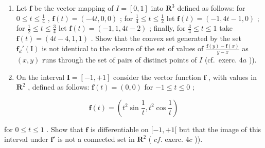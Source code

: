 \begin{enumerate}
\def\labelenumi{\arabic{enumi})}
\setcounter{enumi}{4}
\item
  Let \(\mathbf{f}\) be the vector mapping of \(I = [0, 1]\) into \(\mathbf{R}^3\) defined as follows: for \(0 \leqslant t \leqslant \frac{1}{4}\) , \(\mathbf{f}(t) = (-4t, 0, 0)\) ; for \(\frac{1}{4} \leqslant t \leqslant \frac{1}{2}\) let \(\mathbf{f}(t) = (-1, 4t - 1, 0)\) ; for \(\frac{1}{2} \leqslant t \leqslant \frac{3}{4}\) let \(\mathbf{f}(t) = (-1, 1, 4t - 2)\) ; finally, for \(\frac{3}{4} \leqslant t \leqslant 1\) take \(\mathbf{f}(t) = (4t - 4, 1, 1)\) . Show that the convex set generated by the set \(\mathbf{f}_d'(\mathrm{I})\) is not identical to the closure of the set of values of \(\frac{\mathbf{f}(y) - \mathbf{f}(x)}{y - x}\) as \((x, y)\) runs through the set of pairs of distinct points of \(I\) (cf.~exerc. \(4a\) )).
\item
  On the interval \(\mathbf{I} = [-1, + 1]\) consider the vector function \(\mathbf{f}\) , with values in \(\mathbf{R}^2\) , defined as follows: \(\mathbf{f}(t) = (0,0)\) for \(-1\leqslant t\leqslant 0\) ;
\end{enumerate}

\[
\mathbf {f} (t) = \left(t ^ {2} \sin \frac {1}{t}, t ^ {2} \cos \frac {1}{t}\right)
\]

for \(0 \leqslant t \leqslant 1\) . Show that \(\mathbf{f}\) is differentiable on \([-1, +1[\) but that the image of this interval under \(\mathbf{f}'\) is not a connected set in \(\mathbf{R}^2\) ( \(cf.\) exerc. \(4c\) )).

